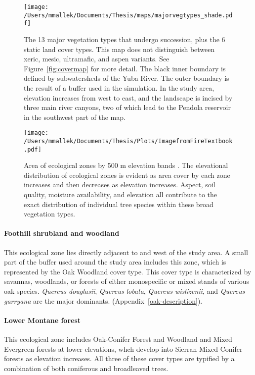 \begin{figure}[!htbp]
\centering
\texttt{[image: /Users/mmallek/Documents/Thesis/maps/majorvegtypes\_shade.pdf]}
\caption{The 13 major vegetation types that undergo succession, plus the 6 static land cover types. This map does not distinguish between xeric, mesic, ultramafic, and aspen variants. See Figure~\ref{fig:covermap} for more detail. The black inner boundary is defined by subwatersheds of the Yuba River. The outer boundary is the result of a buffer used in the simulation. In the study area, elevation increases from west to east, and the landscape is incised by three main river canyons, two of which lead to the Pendola reservoir in the southwest part of the map.
}
\label{fig:majorvegtypes}
\end{figure}


\begin{figure}[!htbp]
\centering
\texttt{[image: /Users/mmallek/Documents/Thesis/Plots/ImagefromFireTextbook.pdf]}
\caption{Area of ecological zones by 500 m elevation bands \citep[][ 269]{VanWag2006}. The elevational distribution of ecological zones is evident as area cover by each zone increases and then decreases as elevation increases. Aspect, soil quality, moisture availability, and elevation all contribute to the exact distribution of individual tree species within these broad vegetation types.}
\label{fig:ecologicalzonebands}
\end{figure}


\paragraph*{Foothill shrubland and woodland} This ecological zone lies directly adjacent to and west of the study area. A small part of the buffer used around the study area includes this zone, which is represented by the Oak Woodland cover type. This cover type is characterized by savannas, woodlands, or forests of either monospecific or mixed stands of various oak species. \emph{Quercus douglasii}, \emph{Quercus lobata}, \emph{Quercus wislizenii}, and \emph{Quercus garryana} are the major dominants. (Appendix~\ref{oak-description}). 

\paragraph*{Lower Montane forest} This ecological zone includes Oak-Conifer Forest and Woodland and Mixed Evergreen forests at lower elevations, whch develop into Sierran Mixed Conifer forests as elevation increases. All three of these cover types are typified by a combination of both coniferous and broadleaved trees. 

